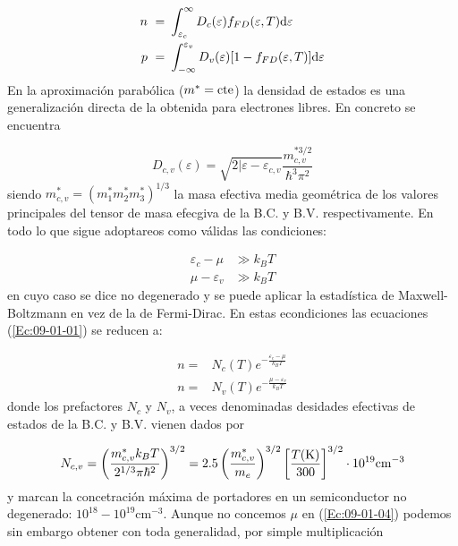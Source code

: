\begin{equation}
\begin{split}
	n \ = \ & \int_{\varepsilon_c}^{\infty} D_c (\varepsilon) f_{FD} (\varepsilon,T) \mathrm{d} \varepsilon \\
	p \ = \ & \int_{-\infty}^{\varepsilon_v} D_v (\varepsilon) [1-f_{FD}(\varepsilon,T)]\mathrm{d} \varepsilon
\end{split}\label{Ec:09-01-01}
\end{equation}
En la aproximación parabólica ($m^* = \text{cte}$) la densidad de estados es una generalización directa de la obtenida para electrones libres. En concreto se encuentra

\begin{equation}
	D_{c,v} (\varepsilon) = \sqrt{2|\varepsilon-\varepsilon_{c,v}} \frac{m_{c,v}^{*3/2}}{\hbar^3 \pi^2}
\end{equation}
siendo $m_{c,v}^*=(m_1^*m_2^*m_3^*)^{1/3}$ la masa efectiva media geométrica de los valores principales del tensor de masa efecgiva de la B.C. y B.V. respectivamente. En todo lo que sigue adoptareos como válidas las condiciones:

\begin{equation}
\begin{split}
\varepsilon_c  - \mu & \gg k_B T \\
\mu - \varepsilon_v & \gg k_B T
\end{split} \label{Ec:09-01-03}
\end{equation}
en cuyo caso se dice no degenerado y se puede aplicar la estadística de Maxwell-Boltzmann en vez de la de Fermi-Dirac. En estas econdiciones las ecuaciones (\ref{Ec:09-01-01}) se reducen a:

\begin{equation}
	\begin{split}
		n = & N_c (T) e^{- \frac{\varepsilon_c - \mu}{k_B T}} \\
		n = & N_v (T) e^{- \frac{\mu-\varepsilon_v}{k_B T}} 
	\end{split} \label{Ec:09-01-04}
\end{equation}
donde los prefactores $N_c$ y $N_v$, a veces denominadas desidades efectivas de estados de la B.C. y B.V. vienen dados por

\begin{equation}
	N_{c,v}= \parentesis{\frac{m_{c,v}^* k_B T}{2^{1/3} \pi \hbar^2}}^{3/2} = 2.5 \parentesis{\frac{m_{c,v}^*}{m_e}}^{3/2} \ccorchetes{\frac{T(\text{K})}{300}}^{3/2} \cdot \unit{10^{19} \cm^{-3}} \label{Ec:09-01-05}
\end{equation}
y marcan la concetración máxima de portadores en un semiconductor no degenerado: $\unit{10^{18}-10^{19} \cm^{-3}}$. Aunque no concemos $\mu$ en (\ref{Ec:09-01-04}) podemos sin embargo obtener con toda generalidad, por simple multiplicación 

